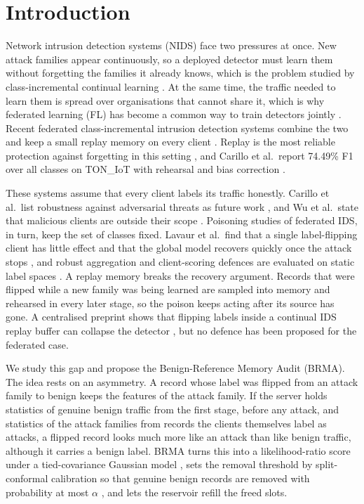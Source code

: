\documentclass[pdflatex,sn-mathphys-num]{sn-jnl}
\theoremstyle{thmstyleone}
\theoremstyle{thmstylethree}
\begin{document}
\section{Introduction}\label{sec:intro}
Network intrusion detection systems (NIDS) face two pressures at once. New attack families appear continuously, so a deployed detector must learn them without forgetting the families it already knows, which is the problem studied by class-incremental continual learning \cite{delange,icarl}. At the same time, the traffic needed to learn them is spread over organisations that cannot share it, which is why federated learning (FL) has become a common way to train detectors jointly \cite{fedavg,kairouz,agrawal}. Recent federated class-incremental intrusion detection systems combine the two and keep a small replay memory on every client \cite{carillo,wu}. Replay is the most reliable protection against forgetting in this setting \cite{der,cerasuolo}, and Carillo et al.\ report 74.49\% F1 over all classes on TON\_IoT with rehearsal and bias correction \cite{carillo}.

These systems assume that every client labels its traffic honestly. Carillo et al.\ list robustness against adversarial threats as future work \cite{carillo}, and Wu et al.\ state that malicious clients are outside their scope \cite{wu}. Poisoning studies of federated IDS, in turn, keep the set of classes fixed. Lavaur et al.\ find that a single label-flipping client has little effect and that the global model recovers quickly once the attack stops \cite{lavaur}, and robust aggregation and client-scoring defences are evaluated on static label spaces \cite{yin,krum,fltrust,wei,lfighter}. A replay memory breaks the recovery argument. Records that were flipped while a new family was being learned are sampled into memory and rehearsed in every later stage, so the poison keeps acting after its source has gone. A centralised preprint shows that flipping labels inside a continual IDS replay buffer can collapse the detector \cite{replaypoison}, but no defence has been proposed for the federated case.

We study this gap and propose the Benign-Reference Memory Audit (BRMA). The idea rests on an asymmetry. A record whose label was flipped from an attack family to benign keeps the features of the attack family. If the server holds statistics of genuine benign traffic from the first stage, before any attack, and statistics of the attack families from records the clients themselves label as attacks, a flipped record looks much more like an attack than like benign traffic, although it carries a benign label. BRMA turns this into a likelihood-ratio score under a tied-covariance Gaussian model \cite{lee2018,ren2019}, sets the removal threshold by split-conformal calibration so that genuine benign records are removed with probability at most $\alpha$ \cite{vovk,bates,angelopoulos}, and lets the reservoir refill the freed slots.
\end{document}
